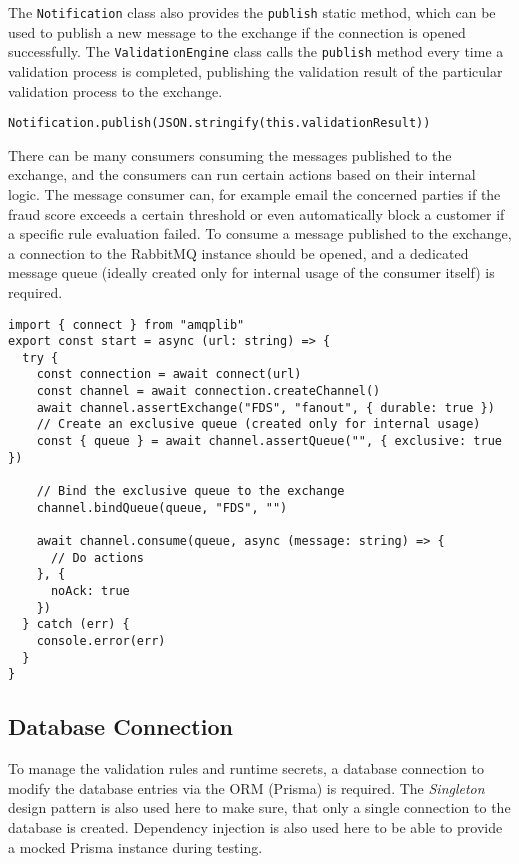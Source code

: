     The \verb;Notification; class also provides the \verb;publish; static method, which can be used to publish a new message to the exchange if the connection is opened successfully. The \verb;ValidationEngine; class calls the \verb;publish; method every time a validation process is completed, publishing the validation result of the particular validation process to the exchange.

    \begin{lstlisting}[style=es6, caption={Publishing a validation result to the RabbitMQ exchange (TypeScript)}]
Notification.publish(JSON.stringify(this.validationResult))
    \end{lstlisting}
    
    There can be many consumers consuming the messages published to the exchange, and the consumers can run certain actions based on their internal logic. The message consumer can, for example email the concerned parties if the fraud score exceeds a certain threshold or even automatically block a customer if a specific rule evaluation failed. To consume a message published to the exchange, a connection to the RabbitMQ instance should be opened, and a dedicated message queue (ideally created only for internal usage of the consumer itself) is required. 

    \begin{lstlisting}[style=es6, caption={Consuming a message published to the RabbitMQ exchange (TypeScript)}]
import { connect } from "amqplib"
export const start = async (url: string) => {
  try {
    const connection = await connect(url)
    const channel = await connection.createChannel()
    await channel.assertExchange("FDS", "fanout", { durable: true })
    // Create an exclusive queue (created only for internal usage)
    const { queue } = await channel.assertQueue("", { exclusive: true })

    // Bind the exclusive queue to the exchange
    channel.bindQueue(queue, "FDS", "") 

    await channel.consume(queue, async (message: string) => {
      // Do actions
    }, {
      noAck: true
    })
  } catch (err) {
    console.error(err)
  }
}
    \end{lstlisting}

  \subsection{Database Connection}
  
    To manage the validation rules and runtime secrets, a database connection to modify the database entries via the ORM (Prisma) is required. The \emph{Singleton} \autocite[pp. 127-134]{gamma-1995} design pattern is also used here to make sure, that only a single connection to the database is created. Dependency injection is also used here to be able to provide a mocked Prisma instance during testing. 

